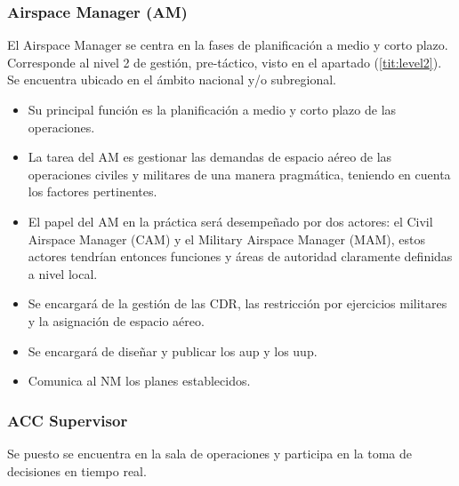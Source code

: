\subsubsection{Airspace Manager (AM)}

El Airspace Manager se centra en la fases de planificación a medio y corto plazo. Corresponde al nivel 2 de gestión, pre-táctico, visto en el apartado (\ref{tit:level2}). Se encuentra ubicado en el ámbito nacional y/o subregional. 

\begin{itemize}
    \item Su principal función es la planificación a medio y corto plazo de las operaciones.
    
    \item La tarea del AM es gestionar las demandas de espacio aéreo de las operaciones civiles y militares de una manera pragmática, teniendo en cuenta los factores pertinentes.
    
    \item El papel del AM en la práctica será desempeñado por dos actores: el Civil Airspace Manager  (CAM) y el Military  Airspace  Manager (MAM), estos actores tendrían entonces funciones y áreas de autoridad claramente definidas a nivel local.
    
    \item Se encargará de la gestión de las CDR, las restricción por ejercicios militares y la asignación de espacio aéreo. 
    
    \item Se encargará de diseñar y publicar los \acrfull{aup} y los \acrfull{uup}.
    
    \item Comunica al NM los planes establecidos.
\end{itemize}

\subsubsection{ACC Supervisor}    

Se puesto se encuentra en la sala de operaciones y participa en la toma de decisiones en tiempo real.

